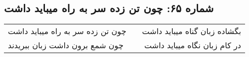 \begin{center}
\section*{شماره ۶۵: چون تن زده سر به راه میباید داشت}
\label{sec:065}
\begin{longtable}{l p{0.5cm} r}
چون تن زده سر به راه میباید داشت
&&
بگشاده زبان گناه میباید داشت
\\
چون شمع برون داشت زبان ببریدند
&&
در کام زبان نگاه میباید داشت
\\
\end{longtable}
\end{center}
